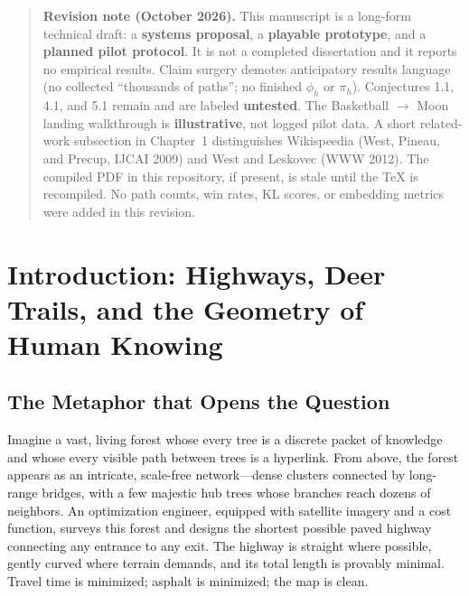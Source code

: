 \documentclass[11pt,a4paper]{report}
\begin{document}
\begin{abstract}
The work bridges two communities. For the general reader it offers a visual metaphor: the difference between an engineered highway that minimizes asphalt and the network of deer trails that minimizes total effort for a foraging mind. For the expert it supplies formal definitions, a precise data schema, a behavioral-cloning objective, and a falsifiable conjecture relating human regret to embedding distortion. A playable prototype is released as open-source single-file HTML at \texttt{https://github.com/IAmM3ta/Where-in-the-Wiki}, enabling pilot data collection. Embedding refinement is future work after validated traces.
\end{abstract}

\begin{quote}
\noindent\textbf{Revision note (October 2026).}
This manuscript is a long-form technical draft: a \textbf{systems proposal}, a \textbf{playable prototype}, and a \textbf{planned pilot protocol}. It is not a completed dissertation and it reports no empirical results. Claim surgery demotes anticipatory results language (no collected ``thousands of paths''; no finished \(\phi_h\) or \(\pi_h\)). Conjectures 1.1, 4.1, and 5.1 remain and are labeled \textbf{untested}. The Basketball \(\to\) Moon landing walkthrough is \textbf{illustrative}, not logged pilot data. A short related-work subsection in Chapter~1 distinguishes Wikispeedia (West, Pineau, and Precup, IJCAI 2009) and West and Leskovec (WWW 2012). The compiled PDF in this repository, if present, is stale until the TeX is recompiled. No path counts, win rates, KL scores, or embedding metrics were added in this revision.
\end{quote}

\tableofcontents
\newpage

\chapter{Introduction: Highways, Deer Trails, and the Geometry of Human Knowing}

\section{The Metaphor that Opens the Question}

Imagine a vast, living forest whose every tree is a discrete packet of knowledge and whose every visible path between trees is a hyperlink. From above, the forest appears as an intricate, scale-free network—dense clusters connected by long-range bridges, with a few majestic hub trees whose branches reach dozens of neighbors. An optimization engineer, equipped with satellite imagery and a cost function, surveys this forest and designs the shortest possible paved highway connecting any entrance to any exit. The highway is straight where possible, gently curved where terrain demands, and its total length is provably minimal. Travel time is minimized; asphalt is minimized; the map is clean.
\end{document}
